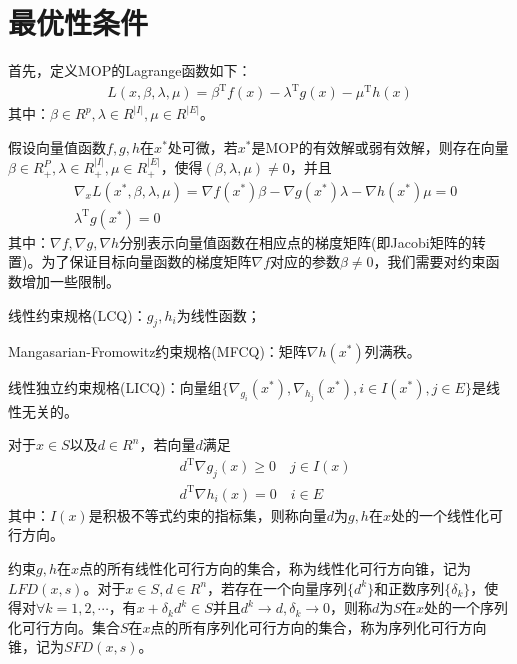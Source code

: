 \section{最优性条件}
    \par
    首先，定义MOP的Lagrange函数如下：
            \begin{align*}
            L(x,\beta,\lambda,\mu)={\beta}^\mathrm{T} f(x)-{\lambda}^\mathrm{T} g(x)-{\mu}^\mathrm{T} h(x)
            \end{align*}
            其中：$\beta \in R^p,{\lambda} \in R^{|I|},{\mu}\in R^{|E|}$。
    \begin{theorem}
    假设向量值函数$f,g,h$在$x^*$处可微，若$x^*$是MOP的有效解或弱有效解，则存在向量$\beta \in R_{+}^P,\lambda \in R_{+}^{|I|},\mu \in R_{+}^{|E|}$，使得$(\beta,\lambda,\mu)\neq 0$，并且
    \begin{align}
      & {\nabla}_xL(x^*,\beta,\lambda,\mu)={\nabla}f(x^*){\beta}-{\nabla}g(x^*){\lambda}-\nabla h(x^*)\mu=0    \label{Fritz John必要条件1}\\
      & {\lambda}^\mathrm{T} g(x^*) = 0 \label{Fritz John必要条件2}
    \end{align}
    其中：$\nabla f,\nabla g,{\nabla} h$分别表示向量值函数在相应点的梯度矩阵(即Jacobi矩阵的转置)。为了保证目标向量函数的梯度矩阵$\nabla f$对应的参数$\beta \neq 0$，我们需要对约束函数增加一些限制。
    \par
    线性约束规格(LCQ)：$g_j,h_i$为线性函数；
    \par
    Mangasarian-Fromowitz约束规格(MFCQ)：矩阵$\nabla h(x^*)$列满秩。
    \par
    线性独立约束规格(LICQ)：向量组$\{{\nabla}_{g_i}(x^*),{\nabla}_{h_j}(x^*), i\in I(x^*),j\in E\}$是线性无关的。
    \end{theorem}
    对于$x\in S$以及$d \in R^n$，若向量$d$满足
    \begin{align*}
    & d^\mathrm{T} {\nabla}{g_j}(x) \geqslant 0\quad j \in I(x)\\
    & d^\mathrm{T} {\nabla}{h_i}(x) = 0\quad i \in E
    \end{align*}
    其中：$I(x)$是积极不等式约束的指标集，则称向量$d$为$g,h$在$x$处的一个线性化可行方向。
    \par
    约束$g,h$在$x$点的所有线性化可行方向的集合，称为线性化可行方向锥，记为$LFD(x,s)$。对于$x\in S,d\in R^n$，若存在一个向量序列$\{d^k\}$和正数序列$\{{\delta}_k\}$，使得对$\forall k=1,2,\cdots$，有$x+{\delta}_kd^k \in S$并且$d^k \to d,{\delta}_k \to 0$，则称$d$为$S$在$x$处的一个序列化可行方向。集合$S$在$x$点的所有序列化可行方向的集合，称为序列化可行方向锥，记为$SFD(x,s)$。
